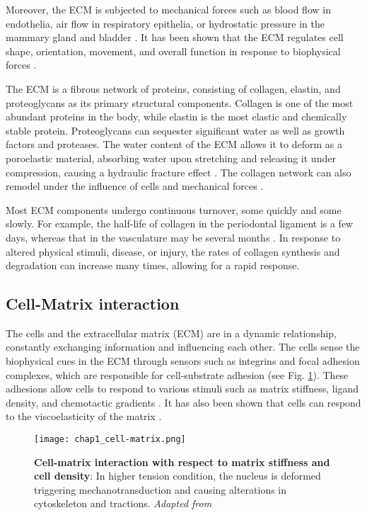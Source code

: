 Moreover, the ECM is subjected to mechanical forces such as blood flow in endothelia, air flow in respiratory epithelia, or hydrostatic pressure in the mammary gland and bladder \cite{waters2012, walma2020}. It has been shown that the ECM regulates cell shape, orientation, movement, and overall function in response to biophysical forces \cite{alberts2015}.

The ECM is a fibrous network of proteins, consisting of collagen, elastin, and proteoglycans as its primary structural components. Collagen is one of the most abundant proteins in the body, while elastin is the most elastic and chemically stable protein. Proteoglycans can sequester significant water as well as growth factors and proteases. The water content of the ECM allows it to deform as a poroelastic material, absorbing water upon stretching and releasing it under compression, causing a hydraulic fracture effect \cite{casares2015}. The collagen network can also remodel under the influence of cells and mechanical forces \cite{humphrey2014}.

Most ECM components undergo continuous turnover, some quickly and some slowly. For example, the half-life of collagen in the periodontal ligament is a few days, whereas that in the vasculature may be several months \cite{humphrey2014}. In response to altered physical stimuli, disease, or injury, the rates of collagen synthesis and degradation can increase many times, allowing for a rapid response.

\hypertarget{cell-matrix-interaction}{%
	\subsection{Cell-Matrix interaction}\label{cell-matrix-interaction}}

The cells and the extracellular matrix (ECM) are in a dynamic relationship, constantly exchanging information and influencing each other. The cells sense the biophysical cues in the ECM through sensors such as integrins and focal adhesion complexes, which are responsible for cell-substrate adhesion \cite{kechagia2019} (see Fig. \ref{fig_1_4}). These adhesions allow cells to respond to various stimuli such as matrix stiffness, ligand density, and chemotactic gradients \cite{fortunato2022}. It has also been shown that cells can respond to the viscoelasticity of the matrix \cite{elosegui-artola2022}.

\begin{figure}[h]
	\centering
	\texttt{[image: chap1\_cell-matrix.png]}
	\caption{\label{fig_1_4} \textbf{Cell-matrix interaction with respect to matrix stiffness and cell density}: In higher tension condition, the nucleus is deformed triggering mechanotransduction and causing alterations in cytoskeleton and tractions. \textit{Adapted from \cite{xi2018}}}
\end{figure}

